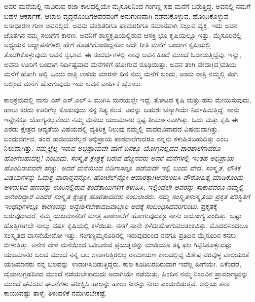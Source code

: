 {ಅವರ ಮನೆಯಲ್ಲಿ ನಾವಿರುವ ರಜಾ ಕಾಲದಲ್ಲಿಯೇ ಮೈಸೂರಿನಿಂದ ಗಂಗಣ್ಣ ಸಹ ಮನೆಗೆ ಬರುತ್ತಿದ್ದ. ಅವನಲ್ಲಿ ನಮಗೆ ಬಹಳ ಆಕರ್ಷಣೆ. ಆಬಾಲ ವೃದ್ಧರೊಂದಿಗೆ\break  ಅವರವರಿಗೆ ಅನುಗುಣವಾಗಿ ನಡೆದುಕೊಳ್ಳುವ, ಹೊಂದಿಕೊಳ್ಳುವ ಅಸಾಧಾರಣ ಗುಣ ಅವನಲ್ಲಿದೆ. ಅವನು ಪಂಡಿತರಿಗೂ ಪಾಮರರಿಗೂ ಸಮಾನವಾಗಿ ಸಲ್ಲುವ ವ್ಯಕ್ತಿ. ಇದು ಅವನ ಜೊತೆಗಿನ ನಮ್ಮ ಸಲುಗೆಗೆ ಕಾರಣ. ಅವನಿಗೆ ಶಾಸ್ತ್ರಕೃಷಿಯಲ್ಲಿರುವ ಆಸಕ್ತಿ ಭೂ\- ಕೃಷಿಯಲ್ಲೂ ಇತ್ತು. ಮೈಸೂರಿನಲ್ಲಿ ಅಧ್ಯಯನ ಅಧ್ಯಾಪನಗಳಲ್ಲಿ ಹೇಗೆ ತೊಡಗಿಕೊಂಡಿದ್ದನೋ ಅದೇ ರೀತಿ ಮನೆಗೆ ಬಂದಾಗ ಕೃಷಿಯಲ್ಲಿ ತೊಡಗಿಕೊಳ್ಳುವುದು ಅವನ ಸ್ವಭಾವ. ಈ ಸಂದರ್ಭಗಳಲ್ಲಿ ನಾವು ಅವನ ಹಿಂದೆ ಮುಂದೆ ಓಡಾಡುತ್ತಿದ್ದೆವು. ಇನ್ನು, ಅವನು ಊರಿಗೆ ಬಂದಾಗ ನಿರ್ದಿಷ್ಟವಾದ ಮನೆಗಳಿಗೆ ಹೋಗುವ ರೂಢಿಯಿತ್ತು. ಅವನ ತಂಗಿ ವೇದಾ(ದ)ವತಿಯ ಮನೆಗೆ ಹೋಗಿ ಅಲ್ಲಿ ಒಂದು ರಾತ್ರಿ ಉಳಿದು ಮಾರನೇ ದಿನ ನಮ್ಮ ಮನೆಗೆ ಬಂದು, ಅಂದು ರಾತ್ರಿ ನಮ್ಮಲ್ಲಿ ತಂಗಿ ಅಲ್ಲಿಂದ ಮನೆಗೆ ಹೋಗುವುದು \enginline{-} ಇದು ಅವನ ವಾರ್ಷಿಕ ಹೈಸಾಲು.

ಕಾಲಕ್ರಮದಲ್ಲಿ ನಾನು ಎಸ್.ಎಸ್.ಎಲ್.ಸಿ ಮುಗಿಸಿ ಮನೆಯಲ್ಲೇ ಇದ್ದೆ. ತೋಟದ ಕೃಷಿ ಮತ್ತು ಹಸು ಮೇಯಿಸುವುದು, ಹಾಲು ಕರೆದು ಊರಿಗೆಲ್ಲ \hbox{ಕೊಡುವುದು} ನನ್ನ ನಿತ್ಯ  ಕೆಲಸ. ಅದನ್ನು  ಬಹುಶಃ ಚೆನ್ನಾಗಿಯೇ ನಿರ್ವಹಿಸುತ್ತಿದ್ದೆ. ನಾನು \hbox{ಇನ್ನೇನಕ್ಕೂ} ಯೋಗ್ಯನಲ್ಲವೆಂದು ನಮ್ಮ ಮನೆಯ ಯಜಮಾನರ  ಸ್ಪಷ್ಟ ತೀರ್ಮಾನ\-ವಾಗಿತ್ತು. ಓದು ಮತ್ತು ಕೃಷಿ ಈ ಎರಡು ಕ್ಷೇತ್ರದ ಆದ್ಯತೆಯ ವಿಷಯದಲ್ಲಿ ವ್ಯತಿರಿಕ್ತ  ನಿಲುವು ನಮ್ಮಲ್ಲಿ ವಾದದ\enginline{-}ವಿವಾದದ ವಿಷಯವಾಗಿತ್ತು. ಬಂಧುವರ್ಗದ,  ತಂದೆ \enginline{-} ತಾಯಿಯರೆಲ್ಲರ ಅಭಿಪ್ರಾಯ ಪಾಠಶಾಲೆ\-ಗಾದರೂ ನನ್ನನು \hbox{ಕಳುಹಿಸಬಹುದಿತ್ತು} ಎಂಬ \hbox{ನಿಲುವಾಗಿತ್ತು.} \textit{ನಮ್ಮಲ್ಲೆಲ್ಲ ಇರುವ ಅಭಿಪ್ರಾಯವೇ ಹಾಗೆ \enginline{-} ಏನಕ್ಕೂ \hbox{ಯೋಗ್ಯನಲ್ಲದವ} ಪಾಠಶಾಲೆಗಾದರೂ \hbox{ಹೋಗಬಹುದಲ್ಲ!} ಎಂಬುದು. ಸಂಸ್ಕೃತ ಕ್ಷೇತ್ರಕ್ಕೆ ಬರುವ ಹೆಚ್ಚಿನವರು ಅವರ ಮನೆಗಳಲ್ಲಿ ಇಂತಹ ಅಭಿಪ್ರಾಯ ಹೊಂದಿರುವವರೇ ಹೆಚ್ಚು. ಅದರೆ ಮನೆಯಿಂದ ಬಿಡಿಗಾಸನ್ನೂ ಪಡೆಯದೇ ಇಲ್ಲಿ ಬಂದು ವೇದ, ಸಂಸ್ಕೃತ, ಲೌಕಿಕ ವಿಷಯಗಳನ್ನು  ಓದುತ್ತ ವಾರಾನ್ನವನ್ನೋ, ಹೋಟೆಲ್‌ನ್ನೋ ಆಹಾರಕ್ಕಾಗಿ\break ಅವಲಂಬಿಸಿ ಪೌರೋಹಿತ್ಯ ಮಾಡಿಕೊಂಡು ಅಳಿದುಳಿದ ಹಣವನ್ನು ಊರಿನಲ್ಲಿರುವ ತಂದೆತಾಯಿಗಳಿಗೆ ಕಳುಹಿಸಿ, ಇಲ್ಲಿಂದಲೇ ಅವರನ್ನು ಸಾಕುವವರೂ ನಮ್ಮಲ್ಲಿ ಅನೇಕರಿದ್ದಾರೆ ಎಂದರೆ ಸಂಸ್ಕೃತ ಕ್ಷೇತ್ರಕ್ಕೆ ಹೊರತಾದವರು ನಂಬಲಾರರು. ನಮ್ಮ ಸಂಸ್ಕೃತ\enginline{-}ಸಂಸ್ಕೃತಿಯ ಪ್ರಕೃತ ಪರಿಸ್ಥಿತಿಗೆ ಇಂಥವುಗಳಲ್ಲೂ ಕಾರಣವನ್ನು ಅನ್ವೇಶಿಸಬೇಕಾದ\break ಜವಾಬ್ದಾರಿ ಅದಕ್ಕೆ ಸಂಬಂಧಿಸಿದವರಿಗುಂಟು}.  ಪ್ರಕೃತಕ್ಕೆ ಬರುವುದಾದರೆ, ನಮ್ಮ ಯಜಮಾನರಿಗೆ ಮಾತ್ರ ಪಾಠಶಾಲೆಗೆ ಹೋಗುವುದಕ್ಕೂ ನಾನು ಅಯೋಗ್ಯ ಎಂದಿತ್ತು. ಅಷ್ಟು ಹೊತ್ತಿಗಾಗಲೇ ನಾಲ್ಕು ವರ್ಷ ಕೃಷಿಯಲ್ಲಿ ಕಳೆಯಿತು. ನನಗೆ ನಾನೇ ಕಳೆದುಹೋಗುವ\break ಆತಂಕವಿತ್ತು. ಮೊದಲಿನಿಂದಲೂ ಸಂಸ್ಕೃತದ ವಾಸನೆಯೇನೋ ಇತ್ತು. ಗಂಗಣ್ಣ\break ಮೈಸೂರಿನಲ್ಲಿ ಇರುವುದರಿಂದ ನನಗೂ ಪ್ರತಿದಿನ  ಮೈಸೂರಿನ  ಕನಸು ಬೀಳುತ್ತಿತ್ತು. ಅನೇಕ ವೇಳೆ ಮನೆಯಿಂದ ಓಡಿಬರುವ ಪ್ರಯತ್ನವನ್ನು ಮಾಡಿಯೂ ತಕ್ಕ ಫಲ ಗಿಟ್ಟಿಸಿ\-ಕೊಳ್ಳುವಷ್ಟು ಯಜಮಾನರ ಬಲದ ಮುಂದೆ ನನ್ನ ಬಲ ಸಾಕಾಗುತ್ತಿರಲಿಲ್ಲ.\break ರಾಮಾಯಣ ಕಾಲದಲ್ಲಿದ್ದ ವಿಶೇಷ ವರವುಳ್ಳ ವಾಲಿಯಂತೆ ಯಜಮಾನರು ನನ್ನ \hbox{ಬಲವನ್ನು }ಉಡುಗಿಸಿಬಿಡುತ್ತಿದ್ದರು. ಕಾಲ ಕೂಡಿಬರದಿರುವಾಗ ಇವೆಲ್ಲ ಹೀಗೆಯೇ. ಏಕೆಂದರೆ, ದೈವಾನುಗ್ರಹದಿಂದ ಮುಂದೆ ನಡೆಯಬೇಕಾದುದು ಅದಾಗಿಯೇ ನಡೆಯಿತು, \enginline{-} ಹಿಂದಿನ ನಮ್ಮ ನಿಲುವಿನ ಪ್ರಾಮಾಣ್ಯವನ್ನು ಮುಂದೆ ಘಟಿಸುವ ಘಟನೆಗಳು ಪರೀಕ್ಷಿಸಿ ಹಾಲನ್ನು ಹಾಲು ನೀರನ್ನು ನೀರು ಎಂದುಬಿಡುತ್ತವೆ. ಅಲ್ಲಿಯ ತನಕ ಕಾಯುವಷ್ಟು ತಾಳ್ಮೆ, ತಿಳುವಳಿಕೆ ನಮಗಿರಬೇಕಷ್ಟೆ.

}
